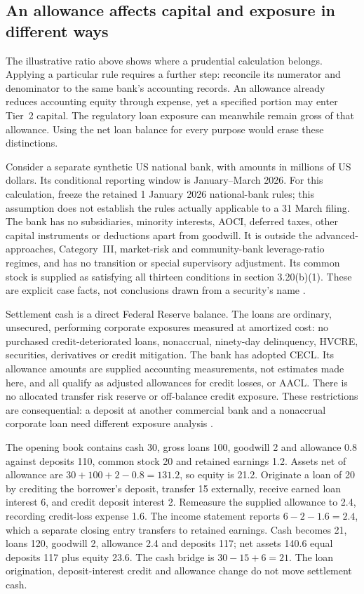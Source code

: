 \subsection{An allowance affects capital and exposure in different ways}
\label{sec:bank-prudential-connection}

The illustrative ratio above shows where a prudential calculation belongs.
Applying a particular rule requires a further step: reconcile its numerator
and denominator to the same bank's accounting records. An allowance already
reduces accounting equity through expense, yet a specified portion may enter
Tier~2 capital. The regulatory loan exposure can meanwhile remain gross of
that allowance. Using the net loan balance for every purpose would erase
these distinctions.

Consider a separate synthetic US national bank, with amounts in millions of
US dollars. Its conditional reporting window is January--March 2026. For
this calculation, freeze the retained 1 January 2026 national-bank rules;
this assumption does not establish the rules actually applicable to a
31 March filing. The bank has no subsidiaries, minority interests, AOCI,
deferred taxes, other capital instruments or deductions apart from goodwill.
It is outside the advanced-approaches, Category~III, market-risk and
community-bank leverage-ratio regimes, and has no transition or special
supervisory adjustment. Its common stock is supplied as satisfying all
thirteen conditions in section 3.20(b)(1). These are explicit case facts,
not conclusions drawn from a security's name
\citep[12~CFR~3.20(b)(1)--(2)]{occcapitaleligibility2026}.

Settlement cash is a direct Federal Reserve balance. The loans are ordinary,
unsecured, performing corporate exposures measured at amortized cost: no
purchased credit-deteriorated loans, nonaccrual, ninety-day delinquency,
HVCRE, securities, derivatives or credit mitigation. The bank has adopted
CECL. Its allowance amounts are supplied accounting measurements, not
estimates made here, and all qualify as adjusted allowances for credit
losses, or AACL. There is no allocated transfer risk reserve or off-balance
credit exposure. These restrictions are consequential: a deposit at another
commercial bank and a nonaccrual corporate loan need different exposure
analysis \citep[12~CFR~3.2, definitions of AACL and carrying value]{occcapitaldefinitions2026}.

The opening book contains cash 30, gross loans 100, goodwill 2 and allowance
0.8 against deposits 110, common stock 20 and retained earnings 1.2.
Assets net of allowance are \(30+100+2-0.8=131.2\), so equity is 21.2.
Originate a loan of 20 by crediting the borrower's deposit, transfer 15
externally, receive earned loan interest 6, and credit deposit interest 2.
Remeasure the supplied allowance to 2.4, recording credit-loss expense 1.6.
The income statement reports \(6-2-1.6=2.4\), which a separate closing entry
transfers to retained earnings. Cash becomes 21, loans 120, goodwill 2,
allowance 2.4 and deposits 117; net assets 140.6 equal deposits 117 plus
equity 23.6. The cash bridge is \(30-15+6=21\). The loan origination,
deposit-interest credit and allowance change do not move settlement cash.

